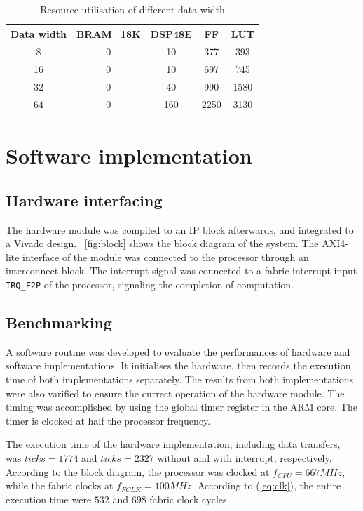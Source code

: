 \documentclass[journal]{IEEEtran}
\newcommand{\fref}[1]{\figurename~\ref{#1}}
\newcommand{\eref}[1]{(\ref{#1})}
\begin{document}
\begin{table}[!ht]
	\renewcommand{\arraystretch}{1.3}
	\caption{Resource utilisation of different data width}
	\label{tbl:reswidth}
	\centering
	\begin{tabular}{ccccc}
		\hline
		Data width	& BRAM\_18K	& DSP48E	& FF	& LUT	\\
		\hline
		8	& 0	& 10	& 377	& 393	\\
		16	& 0	& 10	& 697	& 745	\\
		32	& 0	& 40	& 990	& 1580	\\
		64	& 0	& 160	& 2250	& 3130	\\
		\hline
	\end{tabular}
\end{table}

\section{Software implementation}

\subsection{Hardware interfacing}

The hardware module was compiled to an IP block afterwards, and integrated to a Vivado design. \fref{fig:block} shows the block diagram of the system. The AXI4-lite interface of the module was connected to the processor through an interconnect block. The interrupt signal was connected to a fabric interrupt input \texttt{IRQ\_F2P} of the processor, signaling the completion of computation.

\subsection{Benchmarking}

A software routine was developed to evaluate the performances of hardware and software implementations. It initialises the hardware, then records the execution time of both implementations separately. The results from both implementations were also varified to ensure the currect operation of the hardware module. The timing was accomplished by using the global timer register in the ARM core. The timer is clocked at half the processor frequency.

The execution time of the hardware implementation, including data transfers, was $ticks = 1774$ and $ticks = 2327$ without and with interrupt, respectively. According to the block diagram, the processor was clocked at $f_{CPU} = 667 MHz$, while the fabric clocks at $f_{FCLK} = 100 MHz$. According to \eref{eq:clk}, the entire execution time were $532$ and $698$ fabric clock cycles.
\end{document}
